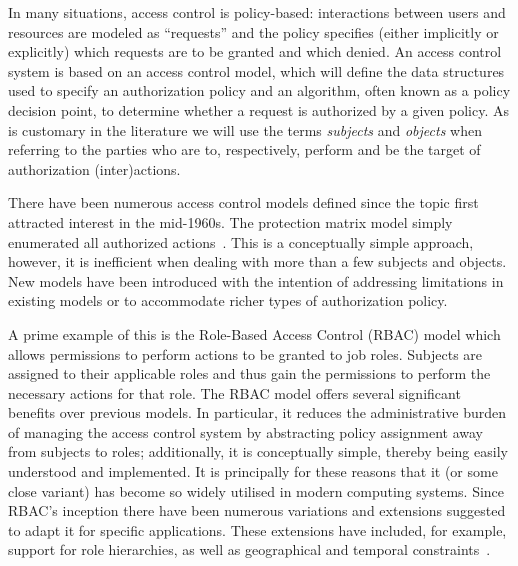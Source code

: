 \documentclass{article}
\begin{document}
In many situations, access control is policy-based: interactions between users and resources are modeled as ``requests'' and the policy specifies (either implicitly or explicitly) which requests are to be granted and which denied.
An access control system is based on an access control model, which will define the data structures used to specify an authorization policy and an algorithm, often known as a policy decision point, to determine whether a request is authorized by a given policy.
As is customary in the literature we will use the terms \emph{subjects} and \emph{objects} when referring to the parties who are to, respectively, perform and be the target of authorization (inter)actions.

There have been numerous access control models defined since the topic first attracted interest in the mid-1960s.
The protection matrix model simply enumerated all authorized actions~\cite{Lampson_Protection}.
This is a conceptually simple approach, however, it is inefficient when dealing with more than a few subjects and objects.
New models have been introduced with the intention of addressing limitations in existing models or to accommodate richer types of authorization policy.

A prime example of this is the Role-Based Access Control (RBAC) model which allows permissions to perform actions to be granted to job roles.
Subjects are assigned to their applicable roles and thus gain the permissions to perform the necessary actions for that role.
The RBAC model offers several significant benefits over previous models.
In particular, it reduces the administrative burden of managing the access control system by abstracting policy assignment away from subjects to roles; additionally, it is conceptually simple, thereby being easily understood and implemented.
It is principally for these reasons that it (or some close variant) has become so widely utilised in modern computing systems.
Since RBAC's inception there have been numerous variations and extensions suggested to adapt it for specific applications.
These extensions have included, for example, support for role hierarchies, as well as geographical and temporal constraints~\cite{BertinoBF01,DamianiBCP07}.
\end{document}
